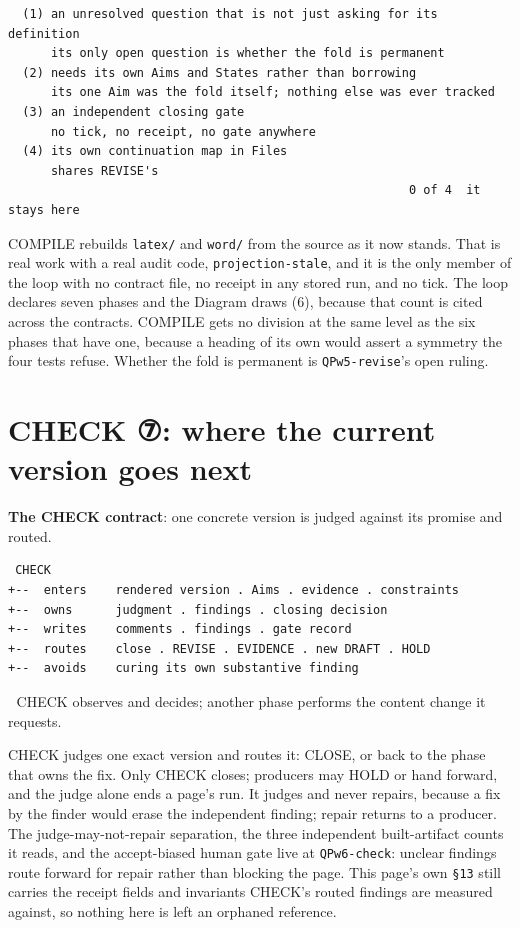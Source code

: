\begin{verbatim}
  (1) an unresolved question that is not just asking for its definition
      its only open question is whether the fold is permanent
  (2) needs its own Aims and States rather than borrowing
      its one Aim was the fold itself; nothing else was ever tracked
  (3) an independent closing gate
      no tick, no receipt, no gate anywhere
  (4) its own continuation map in Files
      shares REVISE's
                                                        0 of 4  it stays here
\end{verbatim}
COMPILE rebuilds \texttt{latex/} and \texttt{word/} from the source as it now stands. That is real work with a real audit code, \texttt{projection-stale}, and it is the only member of the loop with no contract file, no receipt in any stored run, and no tick. The loop declares seven phases and the Diagram draws (6), because that count is cited across the contracts. COMPILE gets no division at the same level as the six phases that have one, because a heading of its own would assert a symmetry the four tests refuse. Whether the fold is permanent is \texttt{QPw5-revise}'s open ruling.


\section{CHECK ⑦: where the current version goes next}
\textbf{The CHECK contract}: one concrete version is judged against its promise and routed.

\begin{verbatim}
 CHECK
+--  enters    rendered version . Aims . evidence . constraints
+--  owns      judgment . findings . closing decision
+--  writes    comments . findings . gate record
+--  routes    close . REVISE . EVIDENCE . new DRAFT . HOLD
+--  avoids    curing its own substantive finding
\end{verbatim}
📌 CHECK observes and decides; another phase performs the content change it requests.

CHECK judges one exact version and routes it: CLOSE, or back to the phase that owns the fix. Only CHECK closes; producers may HOLD or hand forward, and the judge alone ends a page's run. It judges and never repairs, because a fix by the finder would erase the independent finding; repair returns to a producer. The judge-may-not-repair separation, the three independent built-artifact counts it reads, and the accept-biased human gate live at \texttt{QPw6-check}: unclear findings route forward for repair rather than blocking the page. This page's own \texttt{§13} still carries the receipt fields and invariants CHECK's routed findings are measured against, so nothing here is left an orphaned reference.


